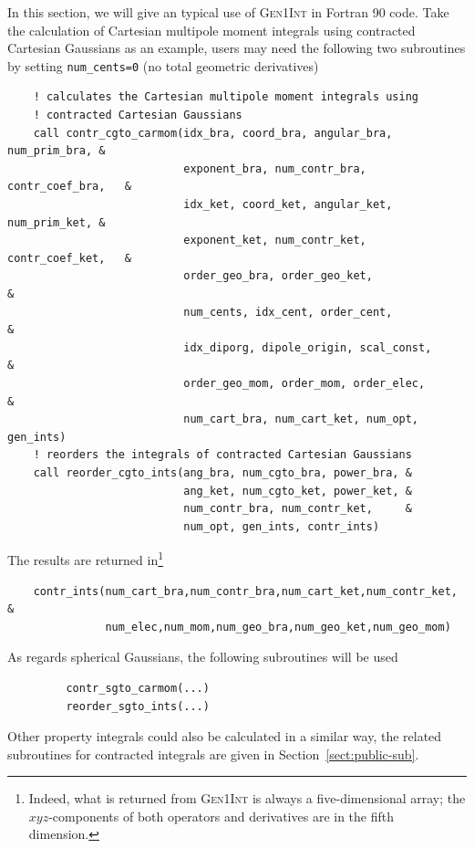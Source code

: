 \documentclass[a4paper,11pt,twoside,openright]{book}
\begin{document}
In this section, we will give an typical use of \textsc{Gen1Int} in Fortran 90 code. Take the calculation
of Cartesian multipole moment integrals using contracted Cartesian Gaussians as an example, users
may need the following two subroutines by setting \verb|num_cents=0| (no total geometric derivatives)
\begin{verbatim}
    ! calculates the Cartesian multipole moment integrals using
    ! contracted Cartesian Gaussians
    call contr_cgto_carmom(idx_bra, coord_bra, angular_bra, num_prim_bra, &
                           exponent_bra, num_contr_bra, contr_coef_bra,   &
                           idx_ket, coord_ket, angular_ket, num_prim_ket, &
                           exponent_ket, num_contr_ket, contr_coef_ket,   &
                           order_geo_bra, order_geo_ket,                  &
                           num_cents, idx_cent, order_cent,               &
                           idx_diporg, dipole_origin, scal_const,         &
                           order_geo_mom, order_mom, order_elec,          &
                           num_cart_bra, num_cart_ket, num_opt, gen_ints)
    ! reorders the integrals of contracted Cartesian Gaussians
    call reorder_cgto_ints(ang_bra, num_cgto_bra, power_bra, &
                           ang_ket, num_cgto_ket, power_ket, &
                           num_contr_bra, num_contr_ket,     &
                           num_opt, gen_ints, contr_ints)
\end{verbatim}
The results are returned in\footnote{Indeed, what is returned from \textsc{Gen1Int} is always a
five-dimensional array; the $xyz$-components of both operators and derivatives are in the fifth dimension.}
\begin{verbatim}
    contr_ints(num_cart_bra,num_contr_bra,num_cart_ket,num_contr_ket, &
               num_elec,num_mom,num_geo_bra,num_geo_ket,num_geo_mom)
\end{verbatim}

As regards spherical Gaussians, the following subroutines will be used
\begin{verbatim}
         contr_sgto_carmom(...)
         reorder_sgto_ints(...)
\end{verbatim}

Other property integrals could also be calculated in a similar way, the related subroutines
for contracted integrals are given in Section~\ref{sect:public-sub}.
\end{document}
